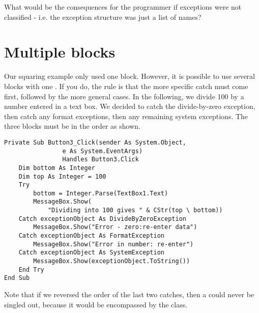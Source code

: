 		\begin{stqb}
			\begin{STQ}
			\item What would be the consequences for the programmer if exceptions were not classified - i.e. the exception structure was just a list of names?
			\end{STQ}
		\end{stqb}


	\section{Multiple  blocks}
		Our squaring example only used one  block. However, it is possible to use several  blocks with one . If you do, the rule is that the more specific catch must come first, followed by the more general cases. In the following, we divide 100 by a number entered in a text box. We decided to catch the divide-by-zero exception, then catch any format exceptions, then any remaining system exceptions. The three  blocks must be in the order as shown.
		\begin{lstlisting}
Private Sub Button3_Click(sender As System.Object,
				e As System.EventArgs)
				Handles Button3.Click
	Dim bottom As Integer
	Dim top As Integer = 100
	Try
		bottom = Integer.Parse(TextBox1.Text)
		MessageBox.Show(
			"Dividing into 100 gives " & CStr(top \ bottom))
	Catch exceptionObject As DivideByZeroException
		MessageBox.Show("Error - zero:re-enter data")
	Catch exceptionObject As FormatException
		MessageBox.Show("Error in number: re-enter")
	Catch exceptionObject As SystemException
		MessageBox.Show(exceptionObject.ToString())
	End Try
End Sub
		\end{lstlisting}
		Note that if we reversed the order of the last two catches, then a  could never be singled out, because it would be encompassed by the  class.


